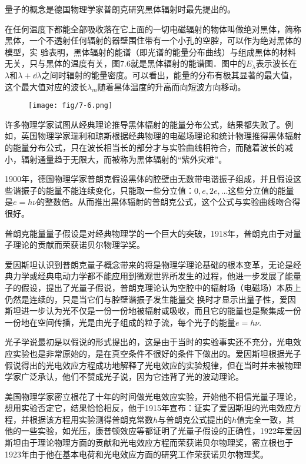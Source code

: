 量子的概念是德国物理学家普朗克研究黑体辐射时最先提出的。

在任何温度下都能全部吸收落在它上面的一切电磁辐射的物体叫做绝对黑体，简称黑体，一个不透射任何辐射的器壁围住带有一个小孔的空腔，可以作为绝对黑体的模型，实
验表明，黑体辐射的能谱（即光谱的能量分布曲线）与组成黑体的材料无关，只与黑体的温度有关，图7.6就是黑体辐射的能谱图．图中的$E_{\lambda}$表示波长在$\lambda$和$\lambda+\dd \lambda$之间时辐射的能量密度。可以看出，能量的分布有极其显著的最大值，这个最大值对应的波长$\lambda_m$随着黑体温度的升高而向短波方向移动。
\begin{figure}[htp]
    \centering
\texttt{[image: fig/7-6.png]}
    \caption{}
\end{figure}

许多物理学家试图从经典理论推导黑体辐射的能量分布公式，结果都失败了。例如，英国物理学家瑞利和琼斯根据经典物理的电磁场理论和统计物理推得黑体辐射的能量分布公式，只在波长相当长的部分才与实验曲线相符合，而随着波长的减小，辐射通量趋于无限大，而被称为黑体辐射的“紫外灾难”。

1900年，德国物理学家普朗克假设黑体的腔壁由无数带电谐振子组成，并且假设这些谐振子的能量不能连续变化，只能取一些分立值：$0,e,2e,\ldots$这些分立值的能量是$e=h\nu$的整数倍。从而推出黑体辐射的普朗克公式，这个公式与实验曲线吻合得很好。

普朗克能量量子假设是对经典物理学的一个巨大的突破，1918年，普朗克由于对量子理论的贡献而荣获诺贝尔物理学奖。

爱因斯坦认识到普朗克量子概念带来的将是物理学理论基础的根本变革，无论是经典力学或经典电动力学都不能应用到微观世界所发生的过程，他进一步发展了能量子的假设，提出了光量子假说，普朗克理论认为空腔中的辐射场（电磁场）本质上仍然是连续的，只是当它们与腔壁谐振子发生能量交
换时才显示出量子性，爱因斯坦进一步认为光不仅是一份一份地被辐射或吸收，而且它的能量也是聚集成一份一份地在空间传播，光是由光子组成的粒子流，每个光子的能量$e=h\nu$.

光子学说最初是以假说的形式提出的，这是由于当时的实验事实还不充分，光电效应实验也是非常原始的，是在真空条件不很好的条件下做出的。爱因斯坦根据光子假说得出的光电效应方程成功地解释了光电效应的实验规律，但在当时并未被物理学家广泛承认，他们不赞成光子说，因为它违背了光的波动理论。

美国物理学家密立根花了十年的时间做光电效应实验，开始他不相信光量子理论，想用实验否定它，结果恰恰相反，他于1915年宣布：证实了爱因斯坦的光电效应方程，并根据该方程用实验测得普朗克常数$h$与普朗克公式提出的$h$值完全一致，其他的一些实验，如光压，康普顿效应等都证明了光量子假设的正确性，1922年爱因斯坦由于理论物理方面的贡献和光电效应方程而荣获诺贝尔物理奖，密立根也于1923年由于他在基本电荷和光电效应方面的研究工作荣获诺贝尔物理奖。


